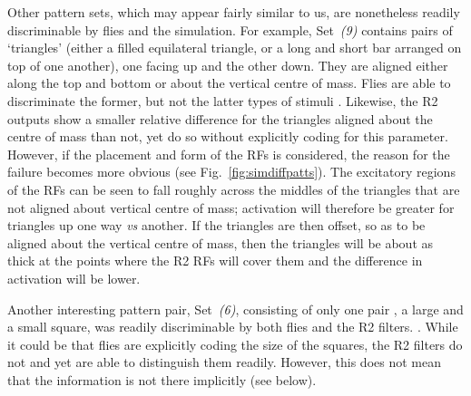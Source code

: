 
Other pattern sets, which may appear fairly similar to us, are nonetheless readily discriminable by flies and the simulation. 
For example, Set~\emph{(9)} contains pairs of `triangles' (either a filled equilateral triangle, or a long and short bar arranged on top of one another), one facing up and the other down.
They are aligned either along the top and bottom or about the vertical centre of mass.
Flies are able to discriminate the former, but not the latter types of stimuli \cite{Ernst1999}. 
Likewise, the R2 outputs show a smaller relative difference for the triangles aligned about the centre of mass than not, yet do so without explicitly coding for this parameter.
However, if the placement and form of the RFs is considered, the reason for the failure becomes more obvious (see Fig.~\ref{fig:simdiffpatts}).
The excitatory regions of the RFs can be seen to fall roughly across the middles of the triangles that are not aligned about vertical centre of mass; activation will therefore be greater for triangles up one way \emph{vs} another.
If the triangles are then offset, so as to be aligned about the vertical centre of mass, then the triangles will be about as thick at the points where the R2 RFs will cover them and the difference in activation will be lower.

Another interesting pattern pair, Set~\emph{(6)}, consisting of only one pair , a large and a small square, was readily discriminable by both flies and the R2 filters.
. While it could be that flies are explicitly coding the size of the squares, the R2 filters do not and yet are able to distinguish them readily.
However, this does not mean that the information is not there implicitly (see below). 


